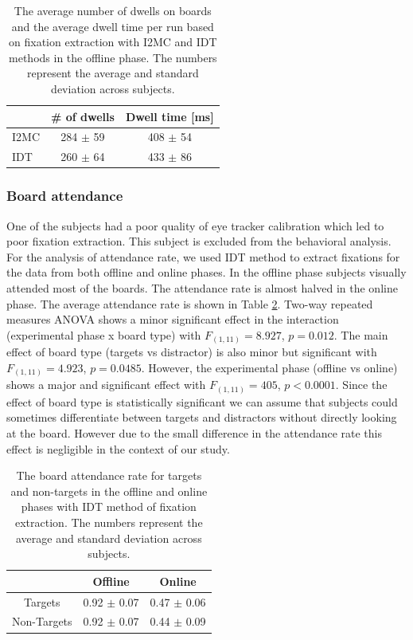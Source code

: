 \documentclass[12pt]{iopart}
\begin{document}
\begin{table}
    \centering
    \caption{The average number of dwells on boards and the average 
        dwell time per run
    based on fixation extraction with I2MC and IDT methods in the
    offline phase.
    The numbers represent the average and standard deviation across subjects.
}
    \begin{tabular}{l | c |c}
        \hline 
        & \# of dwells & Dwell time [ms] \\
        \hline 
        I2MC & 284 $\pm$ 59  & 408 $\pm$ 54 \\
        IDT & 260 $\pm$ 64  & 433 $\pm$ 86 \\
        \hline 
    \end{tabular}
    \label{tab:EyeMethods}
\end{table}
\subsubsection*{Board attendance}
One of the subjects
had a poor quality of eye tracker calibration which led
to poor fixation extraction.
This subject is excluded from the behavioral analysis.
For the analysis of attendance rate, we used IDT method to extract fixations 
for the data from both offline and online phases.
In the offline phase subjects visually attended most of the boards. The attendance rate is almost halved in the online phase. 
The average attendance rate
is shown in Table \ref{tab:boardAtt}. 
Two-way repeated measures ANOVA shows a minor significant effect 
in the interaction (experimental phase x board type) with $F_{(1,11)} = 8.927$, $p = 0.012$. 
The main effect of board type (targets vs distractor) is also minor but significant with $F_{(1,11)} = 4.923$, $p =0.0485$. 
However, the experimental phase (offline vs online)
shows a major and significant effect with $F_{(1,11)} = 405$, $p < 0.0001$.
Since the effect of board type is statistically significant
we can assume that subjects could sometimes differentiate between targets
and distractors without directly looking at the board.
However due to the small difference in the attendance rate
this effect is negligible in the context of our study.


\begin{table}
    \centering
    \caption{The board attendance rate for targets and non-targets in the offline and online phases with IDT method of fixation
        extraction.
    The numbers represent the average and standard deviation across subjects.}
    \begin{tabular}{c | c | c}
        \hline 
        & Offline & Online \\
        \hline 
        Targets & 0.92 $\pm$ 0.07 & 0.47 $\pm$ 0.06 \\
        Non-Targets & 0.92 $\pm$ 0.07 & 0.44 $\pm$ 0.09 \\
        \hline 
    \end{tabular}
    \label{tab:boardAtt}
\end{table}
\end{document}
